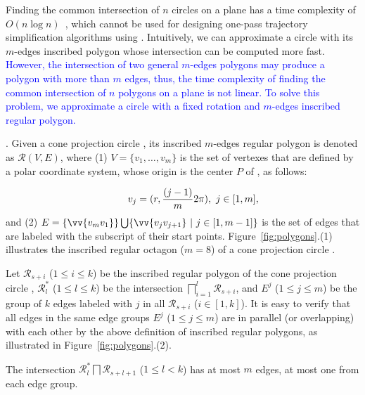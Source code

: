 Finding the common intersection of $n$ circles on a plane has a time complexity of ${O(n\log n)}$~\cite{Shamos:Circle}, which cannot be used for designing one-pass trajectory simplification algorithms using \sed.
%
Intuitively, we can approximate a circle with its $m$-edges inscribed polygon {whose intersection can be computed more fast}. \textcolor{blue}{However, the intersection of two general $m$-edges polygons may produce a polygon with more than $m$ edges, thus, the time complexity of finding the common intersection of $n$ polygons on a plane is not linear. To solve this problem, we approximate a circle with a fixed rotation and $m$-edges inscribed regular polygon.}

.
Given a cone projection circle , its inscribed $m$-edges regular polygon is denoted as $\mathcal{R}(V, E)$,
where (1) $V=\{v_1, \ldots, v_{m}\}$ is the set of vertexes that are defined by a polar coordinate system, whose origin is the center $P$ of \pcircle{}, as follows:


\vspace{-2ex}
\begin{equation*}
\label{equ-regular-polygon}
    \begin{aligned}
        \hspace{5ex}  v_j = (r, \frac{(j-1)}{m}2\pi), ~j \in [1, m], \\
    \end{aligned}
\end{equation*}
%
\ni and (2) $E= \{\vv{v_mv_1}\} \bigcup \{\vv{v_jv_{j+1}}\ |\ j\in [1, m-1]\}$ is the set of edges that are labeled with the subscript of their start points.
%
Figure~\ref{fig:polygons}.(1) illustrates the inscribed regular octagon ($m=8$) of a cone projection circle .

Let $\mathcal{R}_{s+i}$ ($1\le i \le k$) be the inscribed regular polygon of the cone projection  circle ,
$\mathcal{R}^*_l$ ($1\le l\le k$) be the intersection $\bigsqcap_{i=1}^{l}\mathcal{R}_{s+i}$,
and $E^j$ ($1\le j \le m$) be the group of $k$ edges labeled with $j$ in all $\mathcal{R}_{s+i}$ ($i\in[1, k]$).
%
It is easy to verify that all edges in the same edge groups $E^j$ ($1\le j\le m$) are in parallel (or overlapping) with each other by the above definition of inscribed regular polygons, as illustrated in Figure~\ref{fig:polygons}.(2).


\begin{prop}
\label{prop-rp-intersection}
The intersection $\mathcal{R}^*_{l} \bigsqcap \mathcal{R}_{s+l+1}$ ($ 1\le l< k$) has at most $m$ edges, \ie at most one from each edge group.
\end{prop}



